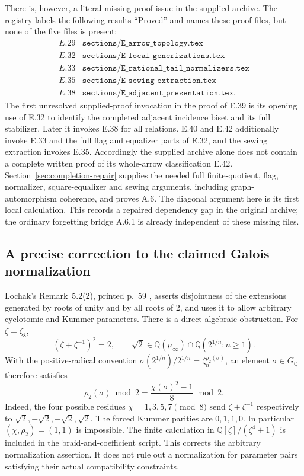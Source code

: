 There is, however, a literal missing-proof issue in the supplied archive.
The registry labels the following results ``Proved'' and names these
proof files, but none of the five files is present:
\[
\begin{array}{c|l}
 E.29&\texttt{sections/E\_arrow\_topology.tex}\\
 E.32&\texttt{sections/E\_local\_generizations.tex}\\
 E.33&\texttt{sections/E\_rational\_tail\_normalizers.tex}\\
 E.35&\texttt{sections/E\_sewing\_extraction.tex}\\
 E.38&\texttt{sections/E\_adjacent\_presentation.tex}.
\end{array}
\]
The first unresolved supplied-proof invocation in the proof of E.39 is
its opening use of E.32 to identify the completed adjacent incidence
biset and its full stabilizer.  Later it invokes E.38 for all relations.
E.40 and E.42 additionally invoke E.33 and the full flag and equalizer
parts of E.32, and the sewing extraction invokes E.35.
Accordingly the supplied archive alone does not contain a complete
written proof of its whole-arrow classification E.42.
Section~\ref{sec:completion-repair} supplies the needed full
finite-quotient, flag, normalizer, square-equalizer and sewing
arguments, including graph-automorphism coherence, and proves A.6.
The diagonal argument here is its first local calculation.
This records a repaired dependency gap in the original archive;
the ordinary forgetting bridge A.6.1 is already independent of
these missing files.

\subsection{A precise correction to the claimed Galois normalization}

Lochak's Remark~5.2(2), printed p.~59 \cite{Lochak2025Aut},
asserts disjointness of the
extensions generated by roots of unity and by all roots of $2$, and
uses it to allow arbitrary cyclotomic and Kummer parameters.
There is a direct algebraic obstruction.  For $\zeta=\zeta_8$,
\[
         (\zeta+\zeta^{-1})^2=2,
 \qquad\sqrt2\in\mathbb Q(\mu_\infty)
                      \cap\mathbb Q(2^{1/n}:n\geq1).
\]
With the positive-radical convention
$\sigma(2^{1/n})/2^{1/n}=\zeta_n^{\rho_2(\sigma)}$, an element
$\sigma\in G_{\mathbb Q}$ therefore satisfies
\[
  \rho_2(\sigma)\bmod2
       =\frac{\chi(\sigma)^2-1}{8}\bmod2.                    \tag{TA.15}
\]
Indeed, the four possible residues $\chi=1,3,5,7\pmod8$
send $\zeta+\zeta^{-1}$ respectively to
$\sqrt2,-\sqrt2,-\sqrt2,\sqrt2$.
The forced Kummer parities are $0,1,1,0$.
In particular $(\chi,\rho_2)=(1,1)$ is impossible.
The finite calculation in $\mathbb Q[\zeta]/(\zeta^4+1)$ is included
in the braid-and-coefficient script.  This corrects the arbitrary
normalization assertion.  It does not rule out a normalization for
parameter pairs satisfying their actual compatibility constraints.

